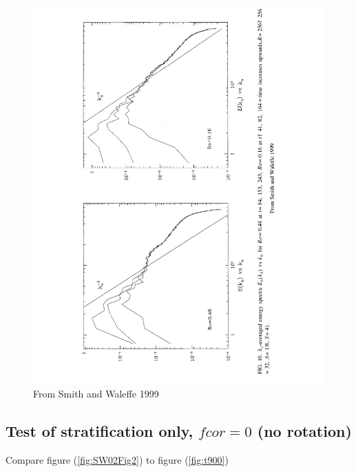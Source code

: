 \documentclass[12pt]{article}
\begin{document}
\begin{figure}
\begin{center}
\includegraphics[angle=-90,width=6.in]{SW99Fig10}
\caption{From Smith and Waleffe 1999}
\label{fig:SW99Fig10}
\end{center}
\end{figure}


\subsection{Test of stratification only, $fcor=0$ (no rotation) }

Compare figure (\ref{fig:SW02Fig2}) to figure (\ref{fig:t900})
\end{document}
